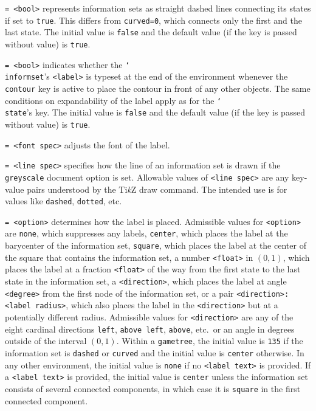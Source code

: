 \documentclass{article}
\newenvironment{desc}{\itemize[leftmargin=50pt]}{\enditemize}
\def\option#1#2{\item[\texttt{#1}] \hskip-1.5pt\texttt{#2}}
\renewcommand{\textbackslash}{\char`\\}
\def\cmd#1{\texttt{\color{cmd}\textbackslash#1}}
\def\TikZ{Ti\emph{k}Z\xspace}
\begin{document}
\begin{desc}
\option{dashed}{= <bool>} represents information sets as straight dashed lines connecting its states if set to \texttt{true}. This differs from \texttt{curved=0}, which connects only the first and the last state. The initial value is \texttt{false} and the default value (if the key is passed without value) is \texttt{true}.
%

\option{delay contour}{= <bool>} indicates whether the \cmd{informset}'s \texttt{<label>} is typeset at the end of the environment whenever the \texttt{contour} key is active to place the contour in front of any other objects. The same conditions on expandability of the label apply as for the \cmd{state}'s key. The initial value is \texttt{false} and the default value (if the key is passed without value) is \texttt{true}.

\option{font}{= <font spec>} adjusts the font of the label.

\option{gsline}{= <line spec>} specifies how the line of an information set is drawn if the \texttt{greyscale} document option is set. Allowable values of \texttt{<line spec>} are any key-value pairs understood by the \TikZ draw command. The intended use is for values like \texttt{dashed}, \texttt{dotted}, etc.

\option{label}{= <option>} determines how the label is placed. Admissible values for \texttt{<option>} are \texttt{none}, which suppresses any labels, \texttt{center}, which places the label at the barycenter of the information set, \texttt{square}, which places the label at the center of the square that contains the information set, a number \texttt{<float>} in $(0, 1)$, which places the label at a fraction \texttt{<float>} of the way from the first state to the last state in the information set, a \texttt{<direction>}, which places the label at angle \texttt{<degree>} from the first node of the information set, or a pair \texttt{<direction>:<label radius>}, which also places the label in the \texttt{<direction>} but at a potentially different radius. Admissible values for \texttt{<direction>} are any of the eight cardinal directions \texttt{left}, \texttt{above left}, \texttt{above}, etc.\ or an angle in degrees outside of the interval $(0, 1)$. Within a \texttt{gametree}, the initial value is \texttt{135} if the information set is \texttt{dashed} or \texttt{curved} and the initial value is \texttt{center} otherwise. In any other environment, the initial value is \texttt{none} if no \texttt{<label text>} is provided. If a \texttt{<label text>} is provided, the initial value is \texttt{center} unless the information set consists of several connected components, in which case it is \texttt{square} in the first connected component.


\end{desc}
\end{document}
